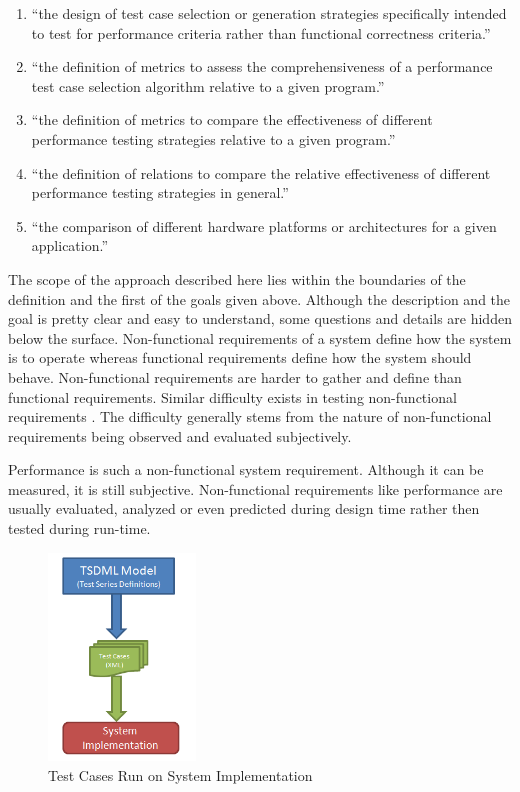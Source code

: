 \begin{enumerate}
	\item ``the design of test case selection or generation strategies specifically intended to test for performance criteria rather than functional correctness criteria.''
	\item ``the definition of metrics to assess the comprehensiveness of a performance test case selection algorithm relative to a given program.''
	\item ``the definition of metrics to compare the effectiveness of different performance testing strategies relative to a given program.''
	\item ``the definition of relations to compare the relative effectiveness of different performance testing strategies in general.''
	\item ``the comparison of different hardware platforms or architectures for a given application.''
\end{enumerate}

The scope of the approach described here lies within the boundaries of the definition and the first of the goals given above. Although the description and the goal is pretty clear and easy to understand, some questions and details are hidden below the surface. Non-functional requirements of a system define how the system is to operate whereas functional requirements define how the system should behave. Non-functional requirements are harder to gather and define than functional requirements. Similar difficulty exists in testing non-functional requirements \cite{Chu99}. The difficulty generally stems from the nature of non-functional requirements being observed and evaluated subjectively. 

Performance is such a non-functional system requirement. Although it can be measured, it is still subjective. Non-functional requirements like performance are usually evaluated, analyzed or even predicted during design time rather then tested during run-time. 

\begin{figure}
	\centering
		\includegraphics[width=0.35\textwidth]{figures/SystemRun.png}
	\caption{Test Cases Run on System Implementation}
	\label{fig:SystemRun}
\end{figure}


